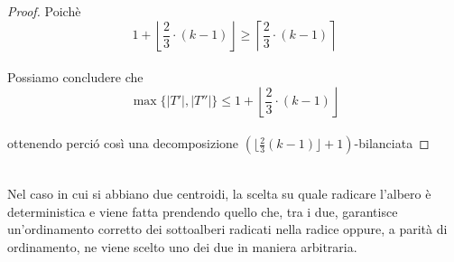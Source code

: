 \begin{proof}
Poich\`e
\\
 	 \[1 + \left\lfloor \frac{2}{3} \cdot (k-1) \right\rfloor \ge \left\lceil \frac{2}{3} \cdot (k-1) \right\rceil \]
 	 \\

Possiamo concludere che
\\

\[\max\{|T'|,|T''|\} \le 1 + \left\lfloor \frac{2}{3} \cdot (k-1) \right\rfloor \]
 \\

ottenendo perci\'o cos\`i una decomposizione $ (\lfloor \frac{2}{3}(k-1) \rfloor + 1)$-bilanciata	 
 	 
\end{proof}\mbox{}\\
 
 	Nel caso in cui si abbiano due centroidi, la scelta su quale radicare l'albero  \`e deterministica e  viene fatta prendendo quello che, tra i due, garantisce un'ordinamento corretto dei sottoalberi radicati nella radice oppure, a parit\`a di ordinamento, ne viene scelto uno dei due in maniera arbitraria. 


